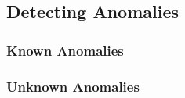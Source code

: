 %

\subsection{Detecting Anomalies}

\subsubsection{Known Anomalies}

\subsubsection{Unknown Anomalies}


